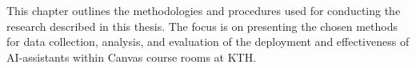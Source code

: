 This chapter outlines the methodologies and procedures used for conducting the research described in this thesis. The focus is on presenting the chosen methods for data collection, analysis, and evaluation of the deployment and effectiveness of AI-assistants within Canvas course rooms at KTH.


